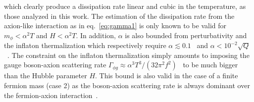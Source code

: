 \documentclass[a4paper,11pt]{article}
\begin{document}
which clearly produce a dissipation rate linear and cubic in the temperature, as those analyzed in this work. The estimation of the dissipation rate from the axion-like interaction as in eq.~\eqref{eq:gamma1} is only known to be valid for $m_{\phi} < \alpha^2 T$ and $H < \alpha^2 T$. In addition, $\alpha$ is also bounded from perturbativity and the inflaton thermalization which respectively require $\alpha\lesssim 0.1$~\cite{Moore:2010jd} and $\alpha < 10^{-2}\sqrt{Q}$~\cite{Berghaus:2019whh}. The constraint on the inflaton thermalization simply amounts to imposing the gauge boson-axion scattering rate $\Gamma_{\phi g}\approx \alpha^3 T^3/(32\pi^2 f^2)$~\cite{Masso:2002np,Graf:2010tv} to be much bigger than the Hubble parameter $H$. This bound is also valid in the case of a finite fermion mass (case 2) as the boson-axion scattering rate is always dominant over the fermion-axion interaction~\cite{Berghaus:2020ekh}.
 
\end{document}
